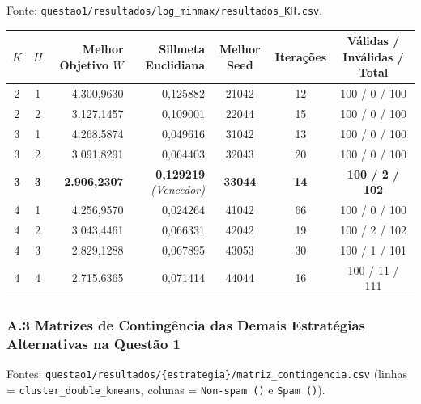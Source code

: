 \documentclass[a4paper,11pt]{article}
\begin{document}
Fonte: \texttt{questao1/\allowbreak resultados/\allowbreak log\_\allowbreak minmax/\allowbreak resultados\_\allowbreak KH.csv}.

\begin{center}
\begin{minipage}{\linewidth}
\centering
{}
\small
\setlength{\tabcolsep}{5pt}
\renewcommand{\arraystretch}{1.18}
\begin{tabular}{c c r r c c c}
\toprule
\textbf{$K$} & \textbf{$H$} & \textbf{Melhor Objetivo $W$} & \textbf{Silhueta Euclidiana} & \textbf{Melhor Seed} & \textbf{Iterações} & \textbf{Válidas / Inválidas / Total} \\
\midrule
2 & 1 & 4.300,9630 & 0,125882 & 21042 & 12 & 100 / 0 / 100 \\
2 & 2 & 3.127,1457 & 0,109001 & 22044 & 15 & 100 / 0 / 100 \\
3 & 1 & 4.268,5874 & 0,049616 & 31042 & 13 & 100 / 0 / 100 \\
3 & 2 & 3.091,8291 & 0,064403 & 32043 & 20 & 100 / 0 / 100 \\
\textbf{3} & \textbf{3} & \textbf{2.906,2307} & \textbf{0,129219} \textit{(Vencedor)} & \textbf{33044} & \textbf{14} & \textbf{100 / 2 / 102} \\
4 & 1 & 4.256,9570 & 0,024264 & 41042 & 66 & 100 / 0 / 100 \\
4 & 2 & 3.043,4461 & 0,066331 & 42042 & 19 & 100 / 2 / 102 \\
4 & 3 & 2.829,1288 & 0,067895 & 43053 & 30 & 100 / 1 / 101 \\
4 & 4 & 2.715,6365 & 0,071414 & 44044 & 16 & 100 / 11 / 111 \\
\bottomrule
\end{tabular}
\end{minipage}
\end{center}


\subsubsection*{A.3 Matrizes de Contingência das Demais Estratégias Alternativas na Questão 1}\label{sec:a-3-matrizes-de-contingencia-das-demais-estrategias-alternativas-na-questao-1}


Fontes: \texttt{questao1/\allowbreak resultados/\allowbreak \{estrategia\}/\allowbreak matriz\_\allowbreak contingencia.csv} (linhas = \texttt{cluster\_\allowbreak double\_\allowbreak kmeans}, colunas = \texttt{Non-spam ()} e \texttt{Spam ()}).
\end{document}
